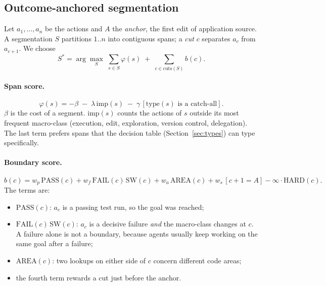 \documentclass[sigconf,nonacm,10pt]{acmart}
\begin{document}
\subsection{Outcome-anchored segmentation}
\label{sec:seg}
Let $a_1,\dots,a_n$ be the actions and $A$ the \emph{anchor}, the first edit of
application source. A segmentation $S$ partitions $1..n$ into contiguous spans; a
\emph{cut} $c$ separates $a_c$ from $a_{c+1}$. We choose
\begin{equation}
S^{*} = \arg\max_{S}\; \sum_{s\in S}\varphi(s) \;+\; \sum_{c\in\mathrm{cuts}(S)} b(c).
\label{eq:objective}
\end{equation}

\paragraph{Span score.}
\begin{equation}
\varphi(s) = -\beta \;-\; \lambda\,\mathrm{imp}(s) \;-\; \gamma\,[\mathrm{type}(s)\text{ is a catch-all}].
\end{equation}
$\beta$ is the cost of a segment. $\mathrm{imp}(s)$ counts the actions of $s$ outside
its most frequent macro-class (execution, edit, exploration, version control,
delegation). The last term prefers spans that the decision table
(Section~\ref{sec:types}) can type specifically.

\paragraph{Boundary score.}
\begin{equation}
b(c) = w_{p}\,\mathrm{PASS}(c) + w_{f}\,\mathrm{FAIL}(c)\,\mathrm{SW}(c) + w_{a}\,\mathrm{AREA}(c) + w_{s}\,[c{+}1 = A] - \infty\cdot\mathrm{HARD}(c).
\end{equation}
The terms are:
\begin{itemize}
  \item $\mathrm{PASS}(c)$: $a_c$ is a passing test run, so the goal was reached;
  \item $\mathrm{FAIL}(c)\,\mathrm{SW}(c)$: $a_c$ is a decisive failure \emph{and} the
        macro-class changes at $c$. A failure alone is not a boundary, because agents
        usually keep working on the same goal after a failure;
  \item $\mathrm{AREA}(c)$: two lookups on either side of $c$ concern different code
        areas;
  \item the fourth term rewards a cut just before the anchor.
\end{itemize}
\end{document}
